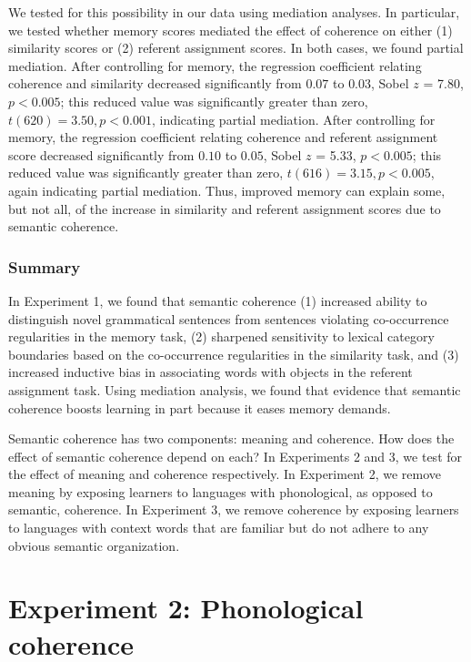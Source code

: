 \documentclass[man,floatsintext]{apa6}
\begin{document}
We tested for this possibility in our data using mediation analyses. In particular, we tested whether memory scores mediated the effect of coherence on either (1) similarity scores or (2) referent assignment scores. In both cases, we found partial mediation. After controlling for memory, the regression coefficient relating coherence and similarity decreased significantly from $0.07$ to $0.03$, Sobel $z$ = 7.80, $p < 0.005$; this reduced value was significantly greater than zero, $t(620) = 3.50, p < 0.001$, indicating partial mediation. After controlling for memory, the regression coefficient relating coherence and referent assignment score decreased significantly from $0.10$ to $0.05$, Sobel $z$ = 5.33, $p < 0.005$; this reduced value was significantly greater than zero, $t(616) = 3.15, p < 0.005$, again indicating partial mediation. Thus, improved memory can explain some, but not all, of the increase in similarity and referent assignment scores due to semantic coherence.

\subsubsection{Summary}

In Experiment 1, we found that semantic coherence (1) increased ability to distinguish novel grammatical sentences from sentences violating co-occurrence regularities in the memory task, (2) sharpened sensitivity to lexical category boundaries based on the co-occurrence regularities in the similarity task, and (3) increased inductive bias in associating words with objects in the referent assignment task. Using mediation analysis, we found that evidence that semantic coherence boosts learning in part because it eases memory demands.

Semantic coherence has two components: meaning and coherence. How does the effect of semantic coherence depend on each? In Experiments 2 and 3, we test for the effect of meaning and coherence respectively. In Experiment 2, we remove meaning by exposing learners to languages with phonological, as opposed to semantic, coherence. In Experiment 3, we remove coherence by exposing learners to languages with context words that are familiar but do not adhere to any obvious semantic organization.

\section{Experiment 2: Phonological coherence}
\end{document}
